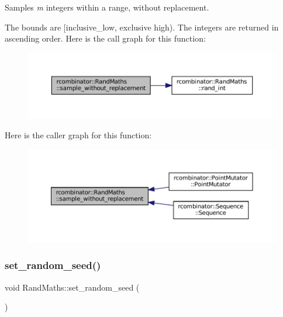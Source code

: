 Samples {\itshape m} integers within a range, without replacement. 

The bounds are \mbox{[}inclusive\+\_\+low, exclusive high). The integers are returned in ascending order. Here is the call graph for this function\+:
\nopagebreak
\begin{figure}[H]
\begin{center}
\leavevmode
\includegraphics[width=350pt]{classrcombinator_1_1RandMaths_a2c31949c9ac03952cb0006e6a88e3d85_cgraph}
\end{center}
\end{figure}
Here is the caller graph for this function\+:
\nopagebreak
\begin{figure}[H]
\begin{center}
\leavevmode
\includegraphics[width=350pt]{classrcombinator_1_1RandMaths_a2c31949c9ac03952cb0006e6a88e3d85_icgraph}
\end{center}
\end{figure}
\mbox{\label{classrcombinator_1_1RandMaths_a2b61e31de6067ffa35531d5bde40f4c6}} 
\subsubsection{\texorpdfstring{set\+\_\+random\+\_\+seed()}{set\_random\_seed()}}
{\footnotesize\ttfamily void Rand\+Maths\+::set\+\_\+random\+\_\+seed (\begin{DoxyParamCaption}{ }\end{DoxyParamCaption})}



